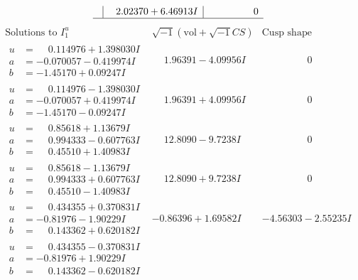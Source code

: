 \documentclass[1p]{elsarticle_modified}
\theoremstyle{definition}
\newcommand{\I}{\sqrt{-1}}
\begin{document}
$$\begin{array}{c|c|c}
 & \phantom{-}2.02370 + 6.46913 I & \phantom{-0.000000 } 0\\
 \hline 
 \end{array}$$\newpage$$\begin{array}{c|c|c}  
\text{Solutions to }I^u_{1}& \I (\text{vol} + \sqrt{-1}CS) & \text{Cusp shape}\\
 \hline 
\begin{aligned}
u &= \phantom{-}0.114976 + 1.398030 I \\
a &= -0.070057 - 0.419974 I \\
b &= -1.45170 + 0.09247 I\end{aligned}
 & \phantom{-}1.96391 - 4.09956 I & \phantom{-0.000000 } 0 \\ \hline\begin{aligned}
u &= \phantom{-}0.114976 - 1.398030 I \\
a &= -0.070057 + 0.419974 I \\
b &= -1.45170 - 0.09247 I\end{aligned}
 & \phantom{-}1.96391 + 4.09956 I & \phantom{-0.000000 } 0 \\ \hline\begin{aligned}
u &= \phantom{-}0.85618 + 1.13679 I \\
a &= \phantom{-}0.994333 - 0.607763 I \\
b &= \phantom{-}0.45510 + 1.40983 I\end{aligned}
 & \phantom{-}12.8090 - 9.7238 I & \phantom{-0.000000 } 0 \\ \hline\begin{aligned}
u &= \phantom{-}0.85618 - 1.13679 I \\
a &= \phantom{-}0.994333 + 0.607763 I \\
b &= \phantom{-}0.45510 - 1.40983 I\end{aligned}
 & \phantom{-}12.8090 + 9.7238 I & \phantom{-0.000000 } 0 \\ \hline\begin{aligned}
u &= \phantom{-}0.434355 + 0.370831 I \\
a &= -0.81976 - 1.90229 I \\
b &= \phantom{-}0.143362 + 0.620182 I\end{aligned}
 & -0.86396 + 1.69582 I & -4.56303 - 2.55235 I \\ \hline\begin{aligned}
u &= \phantom{-}0.434355 - 0.370831 I \\
a &= -0.81976 + 1.90229 I \\
b &= \phantom{-}0.143362 - 0.620182 I\end{aligned}

\end{array}$$
\end{document}

